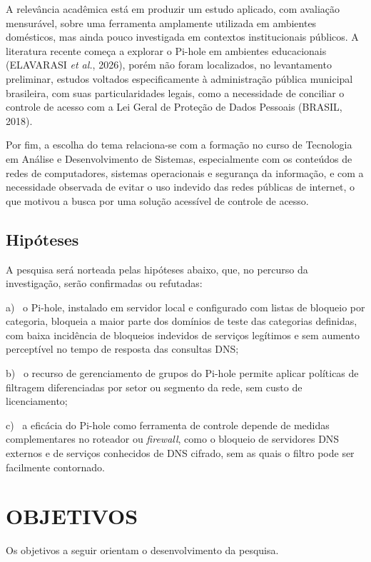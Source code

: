 \documentclass[12pt,a4paper]{article}
\begin{document}
A relevância acadêmica está em produzir um estudo aplicado, com avaliação mensurável, sobre uma ferramenta amplamente utilizada em ambientes domésticos, mas ainda pouco investigada em contextos institucionais públicos. A literatura recente começa a explorar o Pi-hole em ambientes educacionais (ELAVARASI \textit{et al.}, 2026), porém não foram localizados, no levantamento preliminar, estudos voltados especificamente à administração pública municipal brasileira, com suas particularidades legais, como a necessidade de conciliar o controle de acesso com a Lei Geral de Proteção de Dados Pessoais (BRASIL, 2018).

Por fim, a escolha do tema relaciona-se com a formação no curso de Tecnologia em Análise e Desenvolvimento de Sistemas, especialmente com os conteúdos de redes de computadores, sistemas operacionais e segurança da informação, e com a necessidade observada de evitar o uso indevido das redes públicas de internet, o que motivou a busca por uma solução acessível de controle de acesso.

\subsection{Hipóteses}
A pesquisa será norteada pelas hipóteses abaixo, que, no percurso da investigação, serão confirmadas ou refutadas:

{\leftskip=1.25cm\noindent\hangindent=0.6cm a)~ o Pi-hole, instalado em servidor local e configurado com listas de bloqueio por categoria, bloqueia a maior parte dos domínios de teste das categorias definidas, com baixa incidência de bloqueios indevidos de serviços legítimos e sem aumento perceptível no tempo de resposta das consultas DNS;\par}
{\leftskip=1.25cm\noindent\hangindent=0.6cm b)~ o recurso de gerenciamento de grupos do Pi-hole permite aplicar políticas de filtragem diferenciadas por setor ou segmento da rede, sem custo de licenciamento;\par}
{\leftskip=1.25cm\noindent\hangindent=0.6cm c)~ a eficácia do Pi-hole como ferramenta de controle depende de medidas complementares no roteador ou \textit{firewall}, como o bloqueio de servidores DNS externos e de serviços conhecidos de DNS cifrado, sem as quais o filtro pode ser facilmente contornado.\par}
\clearpage
\section{OBJETIVOS}
Os objetivos a seguir orientam o desenvolvimento da pesquisa.
\end{document}
